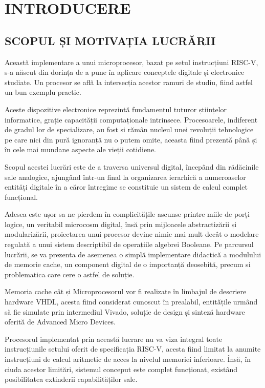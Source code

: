 \documentclass[12pt]{article}
\begin{document}
\tableofcontents
\newpage
\setlength\parindent{15mm}
\section{\centering INTRODUCERE}
\bigbreak
\subsection{SCOPUL ȘI MOTIVAȚIA LUCRĂRII}

Această implementare a unui microprocesor, bazat pe setul instrucțiuni RISC-V, s-a născut din dorința de a pune în aplicare conceptele digitale și electronice studiate. Un procesor se află la intersecția acestor ramuri de studiu, fiind astfel un bun exemplu practic.

Aceste dispozitive electronice reprezintă fundamentul tuturor științelor informatice, grație capacității computaționale intrinsece. Procesoarele, indiferent de gradul lor de specializare, au fost și rămân nucleul unei revoluții tehnologice pe care nici din pură ignoranță nu o putem omite, aceasta fiind prezentă până și în cele mai mundane aspecte ale vieții cotidiene.

Scopul acestei lucrări este de a traversa universul digital, începând din rădăcinile sale analogice, ajungând într-un final la organizarea ierarhică a numeroaselor entități digitale în a căror întregime se constituie un sistem de calcul complet funcțional.

Adesea este ușor sa ne pierdem în complicitățile ascunse printre miile de porți logice, un veritabil microcosm digital, însă prin mijloacele abstractizării și modularizării, proiectarea unui procesor devine nimic mai mult decât o modelare regulată a unui sistem descriptibil de operațiile algebrei Booleane. Pe parcursul lucrării, se va prezenta de asemenea o simplă implementare didactică a modulului de memorie cache, un component digital de o importanță deosebită, precum si problematica care cere o astfel de soluție.

Memoria cache cât și Microprocesorul vor fi realizate în limbajul de descriere hardware VHDL, acesta fiind considerat cunoscut în prealabil, entitățile urmând să fie simulate prin intermediul Vivado, soluție de design și sinteză hardware oferită de Advanced Micro Devices.

Procesorul implementat prin această lucrare nu va viza integral toate instrucțiunile setului oferit de specificația RISC-V, acesta fiind limitat la anumite instrucțiuni de calcul aritmetic de acces la nivelul memoriei inferioare. Însă, în ciuda acestor limitări, sistemul conceput este complet funcționat, existând posibilitatea extinderii capabilităților sale.
\end{document}
